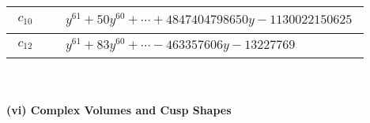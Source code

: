 \documentclass[1p]{elsarticle_modified}
\theoremstyle{definition}
\begin{document}
\begin{tabular}{m{50pt}|m{274pt}}
\hline $$\begin{aligned}c_{10}\end{aligned}$$&$\begin{aligned}
&y^{61}+50 y^{60}+\cdots+4847404798650 y-1130022150625
\end{aligned}$\\
\hline $$\begin{aligned}c_{12}\end{aligned}$$&$\begin{aligned}
&y^{61}+83 y^{60}+\cdots-463357606 y-13227769
\end{aligned}$\\
\hline
\end{tabular}\\~\\
\newpage\flushleft \textbf{(vi) Complex Volumes and Cusp Shapes}
\end{document}
